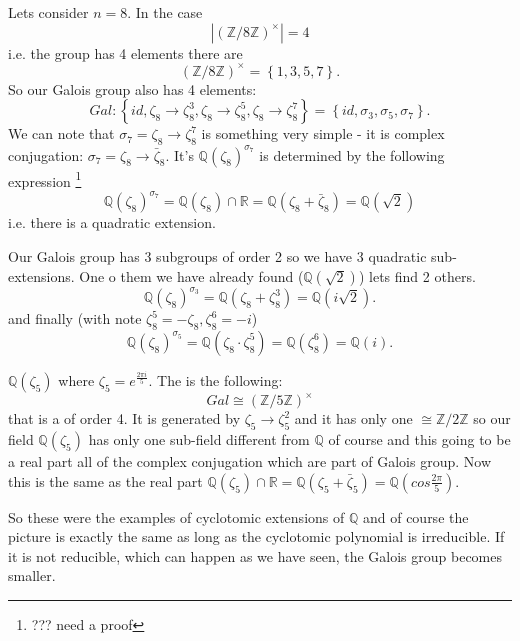 \begin{example}[$n=8$]
  Lets consider $n = 8$. In the case
  \[
  \left|\left(\mathbb{Z}/8\mathbb{Z}\right)^\times\right| = 4
  \]
  i.e. the group has 4 elements there are
  \[
  \left(\mathbb{Z}/8\mathbb{Z}\right)^\times =
  \left\{
  1,3,5,7
  \right\}.
  \]
  So our Galois group also has 4 elements:
  \[
  Gal: \left\{
  id, \zeta_8 \to \zeta_8^3,
  \zeta_8 \to \zeta_8^5, \zeta_8 \to \zeta_8^7
  \right\} =
  \left\{
  id, \sigma_3, \sigma_5, \sigma_7
  \right\}.
  \]
  We can note that $\sigma_7 = \zeta_8 \to \zeta_8^7$ is something
  very simple - it is complex conjugation:
  $\sigma_7 = \zeta_8 \to \bar{\zeta}_8$. It's
   $\mathbb{Q}\left(\zeta_8\right)^{\sigma_7}$
  is determined by the following expression
  \footnote{
    ??? need a proof
  }
  \[
  \mathbb{Q}\left(\zeta_8\right)^{\sigma_7} =
  \mathbb{Q}\left(\zeta_8\right) \cap \mathbb{R} =
  \mathbb{Q}\left(\zeta_8 + \bar{\zeta}_8\right) =
  \mathbb{Q}\left(\sqrt{2}\right)
  \]
  i.e. there is a quadratic extension.

  Our Galois group has 3 subgroups of order 2 so we have 3 quadratic
  sub-extensions. One o them we have already found
  ($\mathbb{Q}\left(\sqrt{2}\right)$) lets find 2 others.
  \[
  \mathbb{Q}\left(\zeta_8\right)^{\sigma_3} =
  \mathbb{Q}\left(\zeta_8 + \zeta_8^3\right) =
  \mathbb{Q}\left(i \sqrt{2}\right).
  \]
  and finally (with note $\zeta_8^5 = - \zeta_8, \zeta_8^6 = -i$)
  \[
  \mathbb{Q}\left(\zeta_8\right)^{\sigma_5} =
  \mathbb{Q}\left(\zeta_8 \cdot \zeta_8^5\right) =
  \mathbb{Q}\left(\zeta_8^6\right) =
  \mathbb{Q}\left(i\right).
  \]  
\end{example}

\begin{example}[$n=5$]
  $\mathbb{Q}\left(\zeta_5\right)$ where $\zeta_5 = e^{\frac{2 \pi
      i}{5}}$. The  is the following:
  \[
  Gal \cong \left(\mathbb{Z}/5\mathbb{Z}\right)^\times
  \]
  that is a  of order 4. It is generated by
  $\zeta_5 \to \zeta_5^2$ and it has only one
   $\cong \mathbb{Z}/2\mathbb{Z}$ so our
  field $\mathbb{Q}\left(\zeta_5\right)$
  has only one sub-field different from $\mathbb{Q}$ of course and
  this going to be a real part all of the complex conjugation which
  are part of Galois group. Now this is the same as the real part
  $\mathbb{Q}\left(\zeta_5\right) \cap \mathbb{R} =
  \mathbb{Q}\left(\zeta_5 + \bar{\zeta}_5\right) =
  \mathbb{Q}\left(cos \frac{2 \pi}{5}\right)$.
\end{example}
So these were the examples of cyclotomic extensions of $\mathbb{Q}$
and of course the picture is exactly the same as long as the
cyclotomic polynomial is irreducible. If it is not reducible, which
can happen as we have seen, the Galois group becomes smaller.


